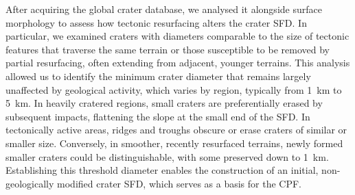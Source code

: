 \documentclass[preprint,11pt,3p,times,authoryear]{elsarticle}
\begin{document}
{After acquiring the global crater database, we analysed it alongside surface morphology to assess how tectonic resurfacing alters the crater SFD. In particular, we examined craters with diameters comparable to the size of tectonic features that traverse the same terrain or those susceptible to be removed by partial resurfacing, often extending from adjacent, younger terrains. This analysis allowed us to identify the minimum crater diameter that remains largely unaffected by geological activity, which varies by region, typically from 1~km to 5~km. In heavily cratered regions, small craters are preferentially erased by subsequent impacts, flattening the slope at the small end of the SFD. In tectonically active areas, ridges and troughs obscure or erase craters of similar or smaller size. Conversely, in smoother, recently resurfaced terrains, newly formed smaller craters could be distinguishable, with some preserved down to 1~km. Establishing this threshold diameter enables the construction of an initial, non-geologically modified crater SFD, which serves as a basis for the CPF.\\

}
\end{document}
